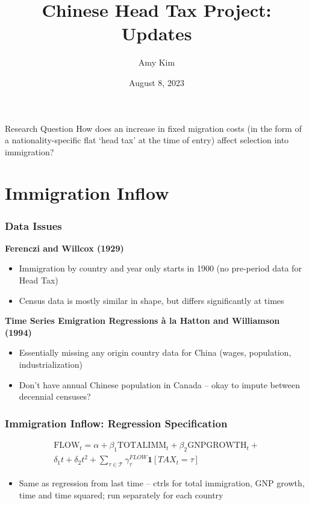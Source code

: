 \documentclass[pdf]{beamer}
\title{Chinese Head Tax Project: Updates}
\author{Amy Kim}
\date{August 8, 2023}
\begin{document}
\begin{frame}[plain]
    \titlepage
\end{frame}

\begin{frame}{Research Question}
    How does an increase in fixed migration costs (in the form of a nationality-specific flat `head tax' at the time of entry) affect selection into immigration?
\end{frame}

\section{Immigration Inflow}
\begin{frame}[label = data1]
    \frametitle{Data Issues}
    \textbf{Ferenczi and Willcox (1929)}
    \begin{itemize}
        \item Immigration by country and year only starts in 1900 (no pre-period data for Head Tax)
        \item Census data is mostly similar in shape, but differs significantly at times \hyperlink{flow_compar_all}{} \hyperlink{flow_compar_belgium}{}  \hyperlink{flow_compar_japan}{}
    \end{itemize}
    \textbf{Time Series Emigration Regressions à la Hatton and Williamson (1994)}
    \begin{itemize}
        \item Essentially missing any origin country data for China (wages, population, industrialization)
        \item Don't have annual Chinese population in Canada -- okay to impute between decennial censuses?
    \end{itemize}
\end{frame}

\begin{frame}[label = flow_reg]
    \frametitle{Immigration Inflow: Regression Specification}
    \begin{multline}
        \text{FLOW}_t = \alpha + \beta_1\text{TOTALIMM}_t + \beta_2\text{GNPGROWTH}_t +  \\ \delta_1 t + \delta_2 t^2 + \sum_{\tau \in \mathcal{T}} \gamma^{FLOW}_\tau \mathbf{1}[TAX_t = \tau] 
    \end{multline}
    \begin{itemize}
        \item Same as regression from last time -- ctrls for total immigration, GNP growth, time and time squared; run separately for each country
    \end{itemize}
\end{frame}
\end{document}
